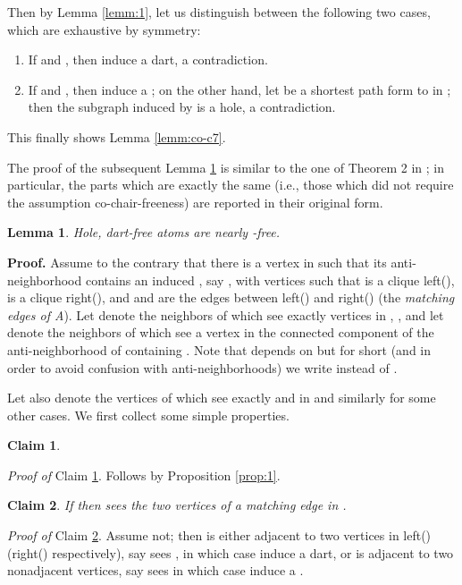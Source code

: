 \documentclass[11pt]{article}
\newcommand{\qed}{\hfill }
\newcommand{\0}{\text{ has a co-join to }}
\newcommand{\1}{\text{ has a join to }}
\newtheorem{lemm}{Lemma}
\newtheorem{clai}{Claim}[section]
\begin{document}
Then by Lemma \ref{lemm:1}, let us distinguish between the following two cases, which are exhaustive by symmetry:

\begin{enumerate}
\item If  and , then  induce a dart, a contradiction.
\item If  and , then  induce a ; on the other hand, let  be a shortest path form  to  in ; then the subgraph induced by  is a hole, a contradiction.   
\end{enumerate}
This finally shows Lemma \ref{lemm:co-c7}.
\qed

\medskip

The proof of the subsequent Lemma \ref{lemm:co-c6} is similar to the one of Theorem 2 in \cite{BraGia2012}; in particular, the parts which are exactly the same (i.e., those which did not require the assumption co-chair-freeness) are reported in their original form.

\begin{lemm}\label{lemm:co-c6}
Hole, dart-free atoms are nearly -free.
\end{lemm}

\noindent
{\bf Proof.}
Assume to the contrary that there is a vertex  in  such that its anti-neighborhood  contains an induced , say , with vertices  such that  is a clique left(),  is a clique right(), and  and  are the edges between left() and right() (the {\em matching edges of A}). Let  denote the neighbors of  which see exactly  vertices in , , and let  denote the neighbors of  which see a vertex in the connected component  of the anti-neighborhood of  containing . Note that  depends on  but for short (and in order to avoid confusion with anti-neighborhoods) we write  instead of .

Let also  denote the vertices of  which see exactly  and  in  and similarly for some other cases. We first collect some simple properties.

\begin{clai}\label{clai:3}

\end{clai}

\noindent
{\em Proof of} Claim \ref{clai:3}. Follows by Proposition \ref{prop:1}. 


\begin{clai}\label{clai:4}
If  then  sees the two vertices of a matching edge in .
\end{clai}

\noindent
{\em Proof of} Claim \ref{clai:4}. Assume not; then  is either adjacent to two vertices in left() (right() respectively), say  sees , in which case  induce a dart, or  is adjacent to two nonadjacent vertices, say  sees  in which case  induce a . 
\end{document}

